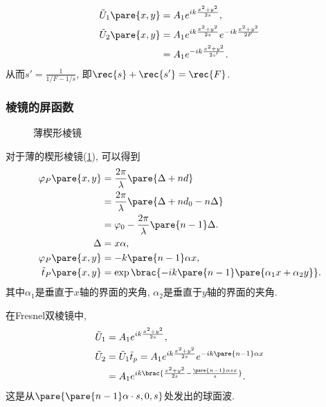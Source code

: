\documentclass{ctexart}
\begin{document}
\begin{sample}
    \begin{ex}[推导物像距公式]
        \begin{align*}
            \tilde{U}_1\pare{x,y} &= A_1 e^{ik \frac{x^2+y^2}{2s}}, \\
            \tilde{U}_2\pare{x,y} &= A_1 e^{ik \frac{x^2+y^2}{2s}}e^{-ik \frac{x^2+y^2}{2F}} \\
            &= A_1 e^{-ik \frac{x^2+y^2}{2s'}}.
        \end{align*}
        从而$\displaystyle s' = \frac{1}{1/F - 1/s}$, 即$\displaystyle \rec{s} + \rec{s'} = \rec{F}$.
    \end{ex}
\end{sample}


\subsubsection{棱镜的屏函数} %
\label{ssub:棱镜的屏函数}

\begin{figure}[ht]
    \centering
    \caption{薄楔形棱镜}
    \label{fig:薄楔形棱镜}
\end{figure}
\begin{sample}
    \begin{ex}
        对于薄的楔形棱镜(\cref{fig:薄楔形棱镜}), 可以得到
        \begin{align*}
            \varphi_P\pare{x,y} &= \frac{2\pi}{\lambda}\pare{\Delta + nd} \\
            &= \frac{2\pi}{\lambda}\pare{\Delta + nd_0 - n\Delta} \\
            &= \varphi_0 - \frac{2\pi}{\lambda}\pare{n-1}\Delta. \\
            \Delta &= x\alpha,\\
            \varphi_P\pare{x,y} &= -k\pare{n-1}\alpha x, \\
            \tilde{t}_P\pare{x,y} &= \exp \brac{-ik\pare{n-1}\pare{\alpha_1 x + \alpha_2 y}}.
        \end{align*}
        其中$\alpha_1$是垂直于$x$轴的界面的夹角, $\alpha_2$是垂直于$y$轴的界面的夹角.
    \end{ex}
    \begin{ex}
        在Fresnel双棱镜中,
        \begin{align*}
            \tilde{U}_1 &= A_1 e^{ik \frac{x^2+y^2}{2s}}, \\
            \tilde{U}_2 &= \tilde{U}_1 \tilde{t}_p = A_1 e^{ik \frac{x^2+y^2}{2s}}e^{-ik\pare{n-1}\alpha x} \\
            &= A_1 e^{ik\brac{\frac{x^2+y^2}{2s} - \frac{\pare{n-1}\alpha sx}{s}}}.
        \end{align*}
        这是从$\pare{\pare{n-1}\alpha\cdot s, 0, s}$处发出的球面波.
    \end{ex}
\end{sample}
\end{document}
